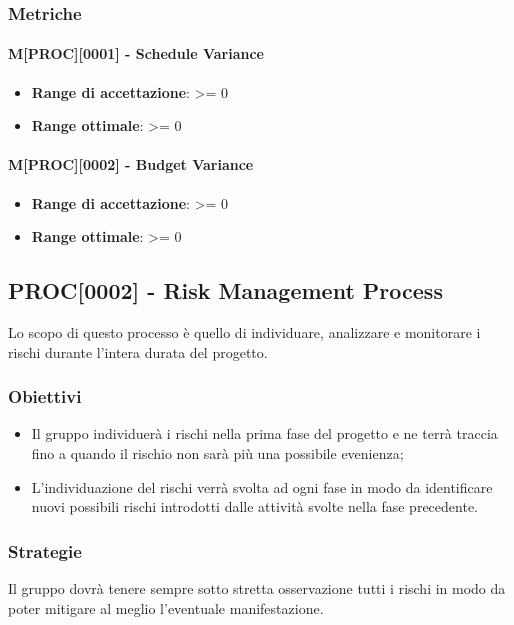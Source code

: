 \subsubsection{Metriche}
\paragraph{M[PROC][0001] - Schedule Variance} 
\begin{itemize}
    \item \textbf{Range di accettazione}: >= 0
    \item \textbf{Range ottimale}: >= 0
\end{itemize}

\paragraph{M[PROC][0002] - Budget Variance} 
\begin{itemize}
    \item \textbf{Range di accettazione}: >= 0
    \item \textbf{Range ottimale}: >= 0
\end{itemize}

\subsection{PROC[0002] - Risk Management Process}
Lo scopo di questo processo è quello di individuare, analizzare e monitorare i rischi durante l'intera durata del progetto.

\subsubsection{Obiettivi}
\begin{itemize}
    \item Il gruppo individuerà i rischi nella prima fase del progetto e ne terrà traccia fino a quando il rischio non sarà più una possibile evenienza;
    \item L'individuazione del rischi verrà svolta ad ogni fase in modo da identificare nuovi possibili rischi introdotti dalle attività svolte nella fase precedente.
\end{itemize}

\subsubsection{Strategie}
Il gruppo dovrà tenere sempre sotto stretta osservazione tutti i rischi in modo da poter mitigare al meglio l'eventuale manifestazione.

